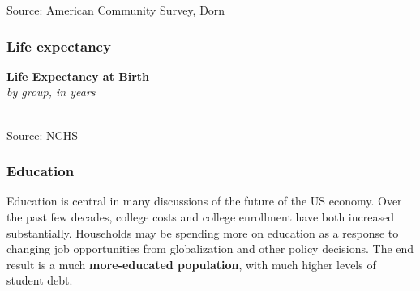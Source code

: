 \documentclass{report}
\makeatletter
\newcommand{\tbllink}[1]{\href{https://raw.githubusercontent.com/bdecon/US-chartbook/master/chartbook/data/#1}{\faTable}}
\newcommand*\short[1]{\expandafter\@gobbletwo\number\numexpr#1\relax}
\newcommand{\absnode}[3]{\node[below right, align=left] at (axis cs: #1,#2) {#3};}
\newcommand{\shdateaxisticks}{
		date coordinates in=x, axis line style={draw=none},
		xmax={2022-10-31},
		max space between ticks=40,	    
		xtick={{1990-01-01}, {1995-01-01}, {2000-01-01}, 
			{2005-01-01}, {2010-01-01}, {2015-01-01}, {2020-01-01}},
		minor xtick={},
		enlarge y limits={0.06}, enlarge x limits={0.01},
		}
\newcommand{\bbar}[2]{extra #1 ticks = {{#2}}, extra #1 tick labels = ,
		extra #1 tick style = {grid=major, grid style={thick, black!25}},}
\newcommand{\thickline}[4]{\addplot[ultra thick, no markers, color=#1] 
		table [x=#2, y=#3, col sep=comma] {#4};	}
\newcommand{\rbars}{
		\fill[color=black!10] (axis cs:{1990-07-01},\pgfkeysvalueof{/pgfplots/ymin}) rectangle 
			(axis cs:{1991-03-01}, \pgfkeysvalueof{/pgfplots/ymax});
		\fill[color=black!10] (axis cs:{2007-12-01},\pgfkeysvalueof{/pgfplots/ymin}) rectangle 
			(axis cs:{2009-07-01}, \pgfkeysvalueof{/pgfplots/ymax});
		\fill[color=black!10] (axis cs:{2001-03-01},\pgfkeysvalueof{/pgfplots/ymin}) rectangle 
			(axis cs:{2001-11-01}, \pgfkeysvalueof{/pgfplots/ymax});
		\fill[color=black!10] (axis cs:{2020-02-01},\pgfkeysvalueof{/pgfplots/ymin}) rectangle 
			(axis cs:{2020-05-01}, \pgfkeysvalueof{/pgfplots/ymax});}
\makeatother
\begin{document}
{\vspace{-3mm}
\hspace{-9mm}  \hspace{-3mm} 

\vspace{-4mm}
\footnotesize{Source: American Community Survey, Dorn} \hspace{61mm} \tbllink{acs_cz_age.csv}
\vspace{3.5mm}

\begin{minipage}{0.76\textwidth}
\subsubsection*{Life expectancy}
\vspace{-0.5mm}

\small 

\begin{minipage}{0.435\textwidth} 
\normalsize \textbf{Life Expectancy at Birth}\\
\footnotesize{\textit{by group, in years}}\\
\noindent \hspace*{-2mm} \\
\footnotesize{Source: NCHS} \hfill \tbllink{life_exp.csv}\end{minipage}\hfill
\begin{minipage}{0.5\textwidth}
\small 
\end{minipage}
\end{minipage}
\newpage
\begin{minipage}{0.76\textwidth}
\subsubsection*{Education}
\small Education is central in many discussions of the future of the US economy. Over the past few decades, college costs and college enrollment have both increased substantially. Households may be spending more on education as a response to changing job opportunities from globalization and other policy decisions. The end result is a much \textbf{more-educated population}, with much higher levels of student debt.
\end{minipage}
\vspace{1mm}

}
\end{document}
